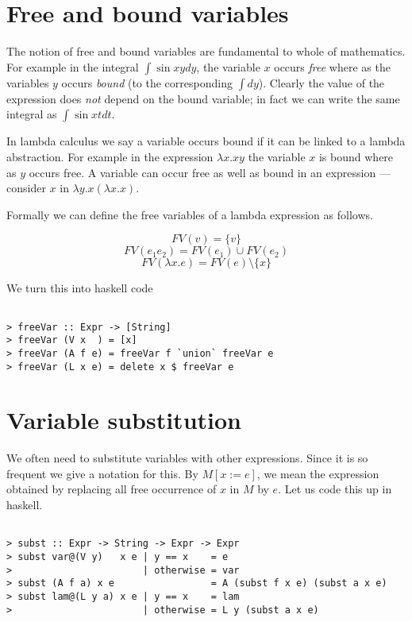 \documentclass{article}
\begin{document}
\section{Free and bound variables}

The notion of free and bound variables are fundamental to whole of
mathematics. For example in the integral $\int \sin{xy} dy$, the
variable $x$ occurs \emph{free} where as the variables $y$ occurs
\emph{bound} (to the corresponding $\int dy$). Clearly the value of the
expression does \emph{not} depend on the bound variable; in fact we can
write the same integral as $\int \sin{xt} dt$.

In lambda calculus we say a variable occurs bound if it can be linked to
a lambda abstraction. For example in the expression $\lambda x. xy$ the
variable $x$ is bound where as $y$ occurs free. A variable can occur
free as well as bound in an expression --- consider $x$ in
$\lambda y. x (\lambda x.x)$.

Formally we can define the free variables of a lambda expression as
follows.

\[FV (v)            = \{ v\}\]
\[FV(e_1 e_2)       = FV(e_1) \cup FV(e_2)\]
\[FV (\lambda x. e) = FV(e) \setminus \{ x \}\]

We turn this into haskell code

\begin{verbatim}

> freeVar :: Expr -> [String]
> freeVar (V x  ) = [x]
> freeVar (A f e) = freeVar f `union` freeVar e
> freeVar (L x e) = delete x $ freeVar e
\end{verbatim}
\section{Variable substitution}

We often need to substitute variables with other expressions. Since it
is so frequent we give a notation for this. By $M [ x := e]$, we mean
the expression obtained by replacing all free occurrence of $x$ in $M$
by $e$. Let us code this up in haskell.

\begin{verbatim}

> subst :: Expr -> String -> Expr -> Expr
> subst var@(V y)   x e | y == x    = e
>                       | otherwise = var
> subst (A f a) x e                 = A (subst f x e) (subst a x e)
> subst lam@(L y a) x e | y == x    = lam
>                       | otherwise = L y (subst a x e)
\end{verbatim}
\end{document}
